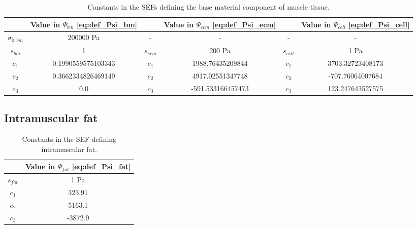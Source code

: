\documentclass{sfuthesis}
\numberwithin{equation}{section}
\numberwithin{figure}{chapter}
\numberwithin{table}{chapter}
\theoremstyle{definition}
\begin{document}
\begin{table}
    \centering
    \begin{tabular}{|c|c|c|c|c|c|}\hline
        & Value in $\Psi_{bm}$ \eqref{eq:def_Psi_bm} & & Value in $\Psi_{ecm}$ \eqref{eq:def_Psi_ecm} & & Value in $\Psi_{cell}$ \eqref{eq:def_Psi_cell} \\\hline
        $\sigma_{0,bm}$ & 200000 \si{Pa} & - & - & - & - \\\hline
        $s_{bm}$ & 1 & $s_{ecm}$ & 200 \si{Pa} & $s_{cell}$ & 1 \si{Pa} \\\hline
        $c_1$ & 0.1990559575103343 & $c_1$ & 1988.76435209844 & $c_1$ & 3703.32723408173 \\\hline
        $c_2$ & 0.3662334826469149 & $c_2$ & 4917.02551347748 & $c_2$ & -707.76064007684 \\\hline
        $c_3$ & 0.0 & $c_3$ & -591.533166457473 & $c_3$ & 123.247643527575 \\\hline
    \end{tabular}
    \caption{Constants in the SEFs defining the base material component of muscle tissue.
    \label{tab:constants_base_material_muscle}}
\end{table}

\subsection{Intramuscular fat} \label{sec:intramuscular_fat}

\begin{table}
    \centering
    \begin{tabular}{|c|c|}\hline
        & Value in $\Psi_{fat}$ \eqref{eq:def_Psi_fat} \\\hline
        $s_{fat}$ & 1 \si{Pa} \\\hline
        $c_1$ & 323.91 \\\hline
        $c_2$ & 5163.1 \\\hline
        $c_3$ & -3872.9 \\\hline
    \end{tabular}
    \caption{Constants in the SEF defining intramuscular fat. \label{tab:constants_fat}}
\end{table}
\end{document}
